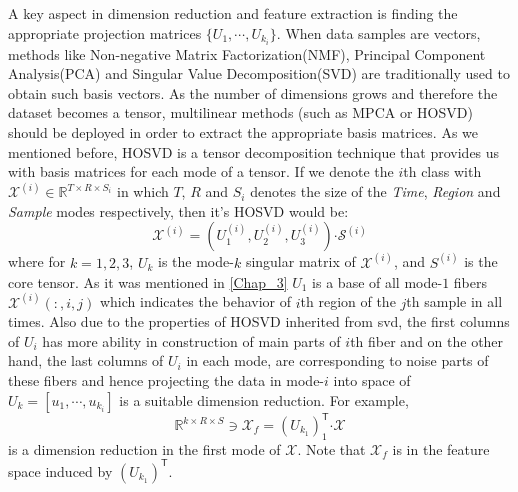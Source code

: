 \documentclass[journal]{IEEEtran}
\newcommand{\trans}{\mathsf{T}}
\begin{document}
	
	A key aspect in dimension reduction and feature extraction is finding the appropriate projection matrices $\{ U_1,\cdots, U_{k_i} \}$. When data samples are vectors, methods like 
	Non-negative Matrix Factorization(NMF), Principal Component Analysis(PCA) and Singular Value Decomposition(SVD) are traditionally used to obtain such basis vectors. As the number of dimensions grows and therefore the dataset becomes a tensor, multilinear methods (such as MPCA or HOSVD) should be deployed in order to extract the appropriate basis matrices.  As we mentioned before, HOSVD is a tensor decomposition technique that provides us with basis matrices for each mode of a tensor. 
	If we denote the $i$th class with 
	$\mathcal{X}^{(i)} \in \mathbb{R}^{T \times R \times S_i}$ in which $T$, $R$ and $S_i$ denotes the size of the \textit{Time}, \textit{Region} and \textit{Sample} modes respectively, then it's HOSVD would be:
	\[
	\mathcal{X}^{(i)} = 
	\left(  
	U_{1}^{(i)},U_{2}^{(i)},U_{3}^{(i)}
	\right)\boldsymbol{\cdot} \mathcal{S}^{(i)}
	\]   
	where for $k= 1,2,3$, $U_{k}$ is the mode-$ k $ singular matrix of $\mathcal{X}^{(i)}$, and $S^{(i)}$ is the core tensor. As it was mentioned in \eqref{Chap_3} $U_{1}$ is a base of all mode-$ 1 $ fibers $\mathcal{X}^{(i)}(:,i,j)$ which indicates the behavior of $i$th region of the $j$th sample in all times. 
	Also due to the properties of HOSVD inherited from svd, the first columns of $U_{i}$ has more ability in construction of main parts of $i$th fiber and on the other hand, the last columns of  $U_{i}$ in each mode, are corresponding to noise parts of these fibers and hence projecting the data in mode-$ i $ into space of $U_{k} = \left[ u_{1}, \cdots, u_{k_i} \right]$
	is a suitable dimension reduction. For example,
	\[
	\mathbb{R}^{k \times R\times S} \ni \mathcal{X}_f = \left(U_{k_1} \right)_1^{\trans} \boldsymbol{\cdot} \mathcal{X} 
	\]
	is a dimension reduction in the first mode of $\mathcal{X}$. Note that $\mathcal{X}_f$ is in the feature space induced by  $\left( U_{k_1} \right)^{\trans}$.
	
\end{document}
